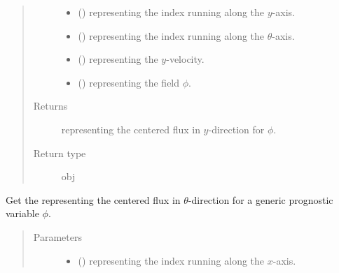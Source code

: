 \documentclass[letterpaper,10pt,english]{sphinxmanual}
\begin{document}
\begin{fulllineitems}
\begin{fulllineitems}
\begin{quote}
\begin{description}
\begin{itemize}
\item {} 
 () \textendash{}  representing the index running along the \(y\)-axis.

\item {} 
 () \textendash{}  representing the index running along the \(\theta\)-axis.

\item {} 
 () \textendash{}  representing the \(y\)-velocity.

\item {} 
 () \textendash{}  representing the field \(\phi\).

\end{itemize}

\item[{Returns}] \leavevmode
{} representing the centered flux in \(y\)-direction for \(\phi\).

\item[{Return type}] \leavevmode
obj

\end{description}\end{quote}

\end{fulllineitems}


\begin{fulllineitems}
\label{\detokenize{api:tasmania.dycore.flux_isentropic_centered.FluxIsentropicCentered._get_centered_flux_z}}
Get the  representing the centered flux in \(\theta\)-direction
for a generic prognostic variable \(\phi\).
\begin{quote}\begin{description}
\item[{Parameters}] \leavevmode\begin{itemize}
\item {} 
 () \textendash{}  representing the index running along the \(x\)-axis.


\end{itemize}
\end{description}
\end{quote}
\end{fulllineitems}
\end{fulllineitems}
\end{document}
